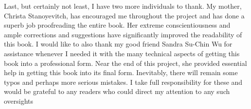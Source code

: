 \documentclass{book}
\begin{document}
Last, but certainly not least, I have two more individuals to thank. My mother,
Christa Stanoyevitch, has encouraged me throughout the project and has done a
superb job proofreading the entire book. Her extreme conscientiousness and
ample corrections and suggestions have significantly improved the readability of
this book. I would like to also thank my good friend Sandra Su-Chin Wu for
assistance whenever I needed it with the many technical aspects of getting this
book into a professional form. Near the end of this project, she provided essential
help in getting this book into its final form. Inevitably, there will remain some
typos and perhaps more serious mistakes. I take full responsibility for these and
would be grateful to any readers who could direct my attention to any such
oversights
\end{document}
